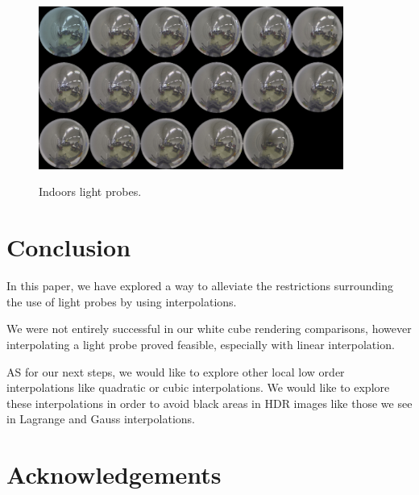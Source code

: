 \documentclass[conference]{acmsiggraph}
\begin{document}
	\begin{figure}[!ht]
		\caption{Indoors light probes.}
		\centering
		\includegraphics[width=10cm]{images/lightprobesint.png}
		\label{fig:lpint}
	\end{figure}

\section{Conclusion}

In this paper, we have explored a way to alleviate the restrictions surrounding the use of light probes by using interpolations. 

We were not entirely successful in our white cube rendering comparisons, however interpolating a light probe proved feasible, especially with linear interpolation.

AS for our next steps, we would like to explore other local low order interpolations like quadratic or cubic interpolations. We would like to explore these interpolations in order to avoid black areas in HDR images like those we see in Lagrange and Gauss interpolations.


\section*{Acknowledgements}



\end{document}
